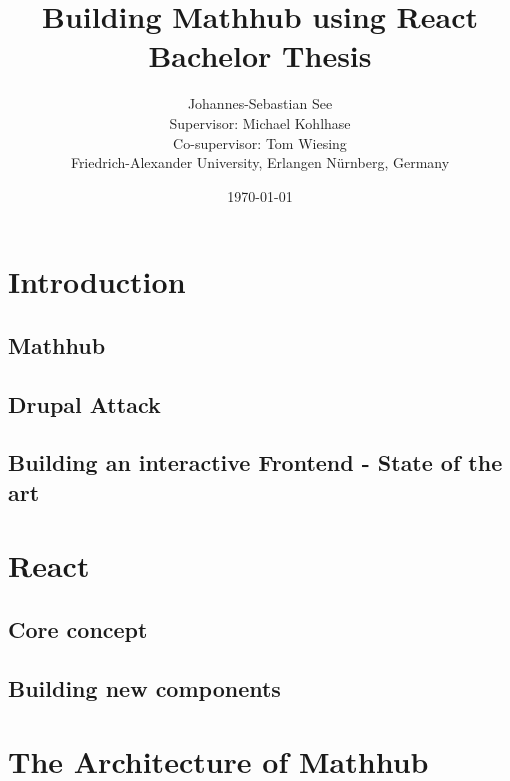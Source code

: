 \documentclass[11pt,a4paper]{article}
\title{Building Mathhub using React\\ \vspace{2 mm} Bachelor Thesis}
\author{Johannes-Sebastian See\\Supervisor: Michael Kohlhase\\Co-supervisor: Tom Wiesing\\Friedrich-Alexander University, Erlangen Nürnberg, Germany}
\date{\today}
\begin{document}
\begin{titlepage}
\maketitle
\end{titlepage}

\tableofcontents
\section{Introduction}
	\subsection{Mathhub}
	\subsection{Drupal Attack}
	\subsection{Building an interactive Frontend - State of the art}

\section{React}
	\subsection{Core concept}
	\subsection{Building new components}

\section{The Architecture of Mathhub}
\end{document}
